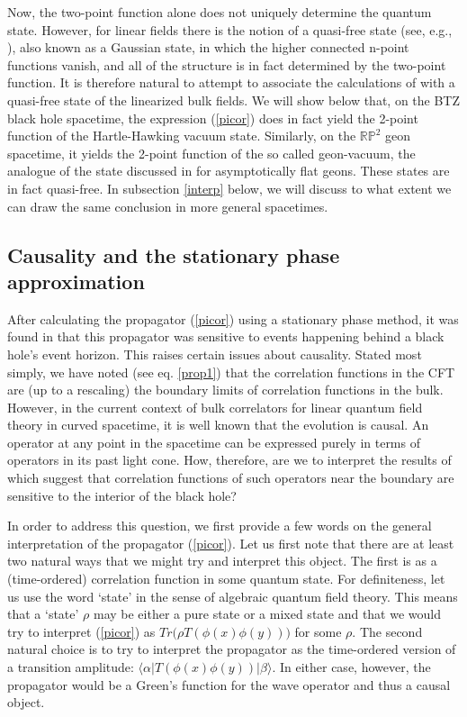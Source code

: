 \documentclass[a4paper,12pt]{article}
\begin{document}
Now, the two-point function alone does not uniquely determine the
quantum state.  However, for linear fields there is the notion of a
quasi-free state (see, e.g., \cite{RMW}), also known as a Gaussian
state, in which the higher connected n-point functions vanish, and all
of the structure is in fact determined by the two-point function.  It
is therefore natural to attempt to associate the calculations of
\cite{holopart} with a quasi-free state of the linearized bulk fields.
We will show below that, on the BTZ black hole spacetime, the
expression (\ref{picor}) does in fact yield the 2-point function of
the Hartle-Hawking vacuum state.  Similarly, on the $\mathbb R \mathbb
P^2$ geon spacetime, it yields the 2-point function of the so called
geon-vacuum, the analogue of the state discussed in \cite{LM} for
asymptotically flat geons.  These states are in fact quasi-free.  In
subsection \ref{interp} below, we will discuss to what extent we can
draw the same conclusion in more general spacetimes.

\subsection{Causality and the stationary phase approximation}
\label{state}

After calculating the propagator (\ref{picor}) using a stationary
phase method, it was found in \cite{holopart} that this propagator was
sensitive to events happening behind a black hole's event horizon.
This raises certain issues about causality.  Stated most simply, we
have noted (see eq. \ref{prop1}) that the correlation functions in the
CFT are (up to a rescaling) the boundary limits of correlation
functions in the bulk.  However, in the current context of bulk
correlators for linear quantum field theory in curved spacetime, it is
well known that the evolution is causal.  An operator at any point in
the spacetime can be expressed purely in terms of operators in its
past light cone.  How, therefore, are we to interpret the results of
\cite{holopart} which suggest that correlation functions of such
operators near the boundary are sensitive to the interior of the black
hole?

In order to address this question, we first provide a few words on the
general interpretation of the propagator (\ref{picor}).  Let us first
note that there are at least two natural ways that we might try and
interpret this object.  The first is as a (time-ordered) correlation
function in some quantum state.  For definiteness, let us use the word
`state' in the sense of algebraic quantum field theory.  This means
that a `state' $\rho$ may be either a pure state or a mixed state and
that we would try to interpret (\ref{picor}) as $Tr \big(\rho
T(\phi(x) \phi(y)) \big)$ for some $\rho$.  The second natural choice
is to try to interpret the propagator as the time-ordered version of a
transition amplitude: $\langle \alpha |T(\phi(x) \phi(y) )| \beta
\rangle$.  In either case, however, the propagator would be a Green's
function for the wave operator and thus a causal object.
\end{document}
